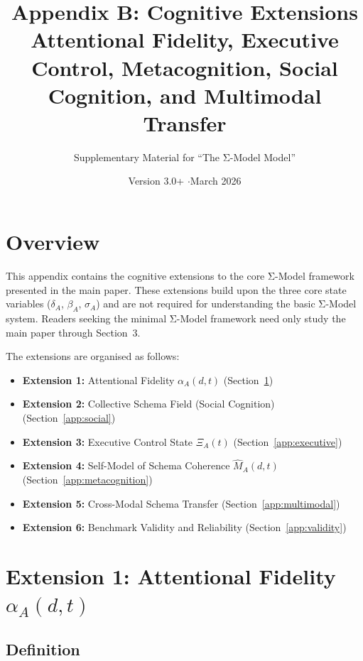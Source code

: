 \documentclass[11pt,a4paper]{article}
\title{\textbf{Appendix B: Cognitive Extensions}\\[6pt]
\large Attentional Fidelity, Executive Control, Metacognition, Social Cognition, and Multimodal Transfer}
\author{Supplementary Material for ``The Σ-Model Model''}
\date{Version 3.0+ \quad$\cdot$\quad March 2026}
\begin{document}
\maketitle

\section*{Overview}\label{app:overview}

This appendix contains the cognitive extensions to the core Σ-Model
framework presented in the main paper. These extensions build upon
the three core state variables ($\delta_A$, $\beta_A$, $\sigma_A$)
and are not required for understanding the basic Σ-Model system.
Readers seeking the minimal Σ-Model framework need only study the
main paper through Section~3.

The extensions are organised as follows:
\begin{itemize}[nosep]
\item \textbf{Extension 1:} Attentional Fidelity $\alpha_A(d,t)$ (Section~\ref{app:attention})
\item \textbf{Extension 2:} Collective Schema Field (Social Cognition) (Section~\ref{app:social})
\item \textbf{Extension 3:} Executive Control State $\Xi_A(t)$ (Section~\ref{app:executive})
\item \textbf{Extension 4:} Self-Model of Schema Coherence $\hat{M}_A(d,t)$ (Section~\ref{app:metacognition})
\item \textbf{Extension 5:} Cross-Modal Schema Transfer (Section~\ref{app:multimodal})
\item \textbf{Extension 6:} Benchmark Validity and Reliability (Section~\ref{app:validity})
\end{itemize}

\section{Extension 1: Attentional Fidelity $\alpha_A(d,t)$}\label{app:attention}

\subsection{Definition}
\end{document}
